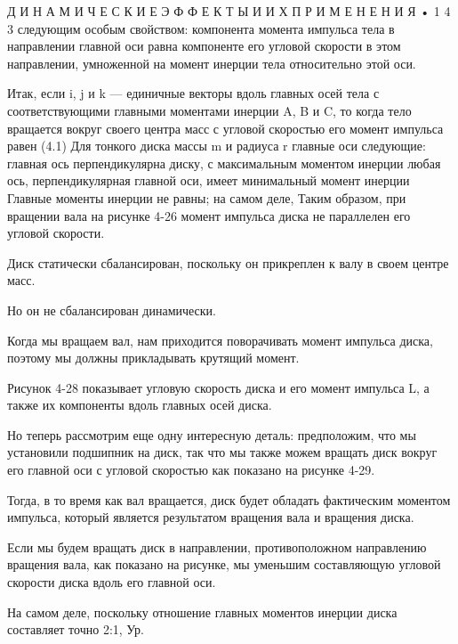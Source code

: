 \documentclass[10pt,oneside]{article}
\begin{document}
Д И Н А М И Ч Е С К И Е  Э Ф Ф Е К Т Ы  И  И Х  П Р И М Е Н Е Н И Я • 1 4 3 следующим особым свойством: компонента момента импульса тела в направлении главной оси равна компоненте его угловой скорости в этом направлении, умноженной на момент инерции тела относительно этой оси.\par

Итак, если i, j и k --- единичные векторы вдоль главных осей тела с соответствующими главными моментами инерции A, B и C, то когда тело вращается вокруг своего центра масс с угловой скоростью его момент импульса равен (4.1) Для тонкого диска массы m и радиуса r главные оси следующие: главная ось перпендикулярна диску, с максимальным моментом инерции любая ось, перпендикулярная главной оси, имеет минимальный момент инерции Главные моменты инерции не равны; на самом деле, Таким образом, при вращении вала на рисунке 4-26 момент импульса диска не параллелен его угловой скорости.\par

Диск статически сбалансирован, поскольку он прикреплен к валу в своем центре масс.\par

Но он не сбалансирован динамически.\par

Когда мы вращаем вал, нам приходится поворачивать момент импульса диска, поэтому мы должны прикладывать крутящий момент.\par

Рисунок 4-28 показывает угловую скорость диска и его момент импульса L, а также их компоненты вдоль главных осей диска.\par

Но теперь рассмотрим еще одну интересную деталь: предположим, что мы установили подшипник на диск, так что мы также можем вращать диск вокруг его главной оси с угловой скоростью как показано на рисунке 4-29.\par

Тогда, в то время как вал вращается, диск будет обладать фактическим моментом импульса, который является результатом вращения вала и вращения диска.\par

Если мы будем вращать диск в направлении, противоположном направлению вращения вала, как показано на рисунке, мы уменьшим составляющую угловой скорости диска вдоль его главной оси.\par

На самом деле, поскольку отношение главных моментов инерции диска составляет точно 2:1, Ур.\par
\end{document}
